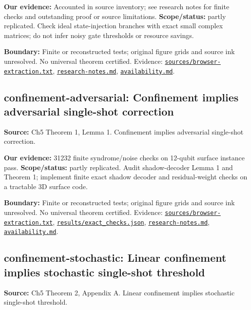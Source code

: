 \documentclass[11pt]{article}
\begin{document}
\textbf{Our evidence:} Accounted in source inventory; see research notes for finite checks and outstanding proof or source limitations. \textbf{Scope/status:} partly replicated. Check ideal state-injection branches with exact small complex matrices; do not infer noisy gate thresholds or resource savings.

\textbf{Boundary:} Finite or reconstructed tests; original figure grids and source ink unresolved. No universal theorem certified. Evidence: \href{https://github.com/alectionary/vibe-math/blob/master/formalization/quintavalle-hgp/sources/browser-extraction.txt}{\nolinkurl{sources/browser-extraction.txt}}, \href{https://github.com/alectionary/vibe-math/blob/master/formalization/quintavalle-hgp/research-notes.md}{\nolinkurl{research-notes.md}}, \href{https://github.com/alectionary/vibe-math/blob/master/formalization/quintavalle-hgp/availability.md}{\nolinkurl{availability.md}}.
\subsection{confinement-adversarial: Confinement implies adversarial single-shot correction}
\label{claim:confinement-adversarial}
\textbf{Source:} Ch5 Theorem 1, Lemma 1. Confinement implies adversarial single-shot correction.

\textbf{Our evidence:} 31232 finite syndrome/noise checks on 12-qubit surface instance pass. \textbf{Scope/status:} partly replicated. Audit shadow-decoder Lemma 1 and Theorem 1; implement finite exact shadow decoder and residual-weight checks on a tractable 3D surface code.

\textbf{Boundary:} Finite or reconstructed tests; original figure grids and source ink unresolved. No universal theorem certified. Evidence: \href{https://github.com/alectionary/vibe-math/blob/master/formalization/quintavalle-hgp/sources/browser-extraction.txt}{\nolinkurl{sources/browser-extraction.txt}}, \href{https://github.com/alectionary/vibe-math/blob/master/formalization/quintavalle-hgp/results/exact_checks.json}{\nolinkurl{results/exact_checks.json}}, \href{https://github.com/alectionary/vibe-math/blob/master/formalization/quintavalle-hgp/research-notes.md}{\nolinkurl{research-notes.md}}, \href{https://github.com/alectionary/vibe-math/blob/master/formalization/quintavalle-hgp/availability.md}{\nolinkurl{availability.md}}.
\subsection{confinement-stochastic: Linear confinement implies stochastic single-shot threshold}
\label{claim:confinement-stochastic}
\textbf{Source:} Ch5 Theorem 2, Appendix A. Linear confinement implies stochastic single-shot threshold.
\end{document}
